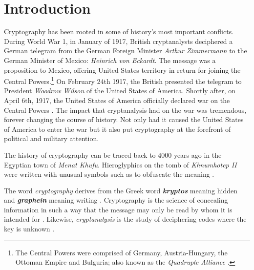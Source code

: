 \chapter{Introduction} %
\label{Introduction} %




Cryptography has been rooted in some of history's most important conflicts. 
During World War 1, in January of 1917, British cryptanalysts deciphered a German
telegram from the German Foreign Minister \textit{Arthur Zimmermann} to the German Minister
of Mexico: \textit{Heinrich von Eckardt}. The message was a proposition to Mexico, offering
United States territory in return for joining the Central Powers.\footnote{The Central Powers 
were comprised of Germany, Austria-Hungary, the Ottoman Empire and Bulguria; also known as
the \textit{Quadruple Alliance} \cite{wiki:central_powers}.} On February 24th 1917, the British
presented the telegram to President \textit{Woodrow Wilson} of the United States of America. 
Shortly after, on April 6th, 1917, the United States of America officially declared war
on the Central Powers \cite{the_zimmermann_telegram}. The impact that cryptanalysis had on
the war was tremendous, forever changing the course of history. Not only had it caused the
United States of America to enter the war but it also put cryptography at the forefront of political
and military attention. 

The history of cryptography can be traced back to 4000 years ago in the Egyptian town of 
\textit{Menat Khufu}. Hieroglyphics on the tomb of \textit{Khnumhotep II} were written with unusual 
symbols such as to obfuscate the meaning \cite{history_of_cryptography}. 

The word \textit{cryptography} derives from the Greek word \textbf{\textit{kryptos}}
meaning hidden and \textbf{\textit{graphein}} meaning writing \cite{pawlan_cryptography}.
Cryptography is the science of concealing information in such a way that the message
may only be read by whom it is intended for \cite{cryptography_definition}. 
Likewise, \textit{cryptanalysis} is the study of deciphering codes where the key is unknown 
\cite{cryptanalysis_definition}.  

